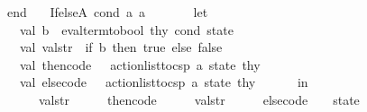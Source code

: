 \begin{isabellebody}
\ \ \ \ \ \ end\isanewline
\ \ {\isacharbar}{\kern0pt}\ IfelseA\ {\isacharparenleft}{\kern0pt}{\isacharparenleft}{\kern0pt}cond{\isacharcomma}{\kern0pt}\ a{}{\isacharparenright}{\kern0pt}{\isacharcomma}{\kern0pt}\ a{}{\isacharparenright}{\kern0pt}\ {\isacharequal}{\kern0pt}{\isachargreater}{\kern0pt}\isanewline
\ \ \ \ \ \ let\isanewline
\ \ \ \ \ \ \ \ val\ b\ {\isacharequal}{\kern0pt}\ eval{\isacharunderscore}{\kern0pt}term{\isacharunderscore}{\kern0pt}to{\isacharunderscore}{\kern0pt}bool\ thy\ cond\ state\isanewline
\ \ \ \ \ \ \ \ val\ val{\isacharunderscore}{\kern0pt}str\ {\isacharequal}{\kern0pt}\ if\ b\ then\ {\isachardoublequote}{\kern0pt}true{\isachardoublequote}{\kern0pt}\ else\ {\isachardoublequote}{\kern0pt}false{\isachardoublequote}{\kern0pt}\isanewline
\ \ \ \ \ \ \ \ val\ {\isacharparenleft}{\kern0pt}then{\isacharunderscore}{\kern0pt}code{\isacharcomma}{\kern0pt}\ {\isacharunderscore}{\kern0pt}{\isacharparenright}{\kern0pt}\ {\isacharequal}{\kern0pt}\ action{\isacharunderscore}{\kern0pt}list{\isacharunderscore}{\kern0pt}to{\isacharunderscore}{\kern0pt}csp\ a{}\ state\ thy\isanewline
\ \ \ \ \ \ \ \ val\ {\isacharparenleft}{\kern0pt}else{\isacharunderscore}{\kern0pt}code{\isacharcomma}{\kern0pt}\ {\isacharunderscore}{\kern0pt}{\isacharparenright}{\kern0pt}\ {\isacharequal}{\kern0pt}\ action{\isacharunderscore}{\kern0pt}list{\isacharunderscore}{\kern0pt}to{\isacharunderscore}{\kern0pt}csp\ a{}\ state\ thy\isanewline
\ \ \ \ \ \ in\isanewline
\ \ \ \ \ \ \ \ {\isacharparenleft}{\kern0pt}{\isachardoublequote}{\kern0pt}{\isacharbraceleft}{\kern0pt}\ {\isacharparenleft}{\kern0pt}{\isachardoublequote}{\kern0pt}\ {\isacharcircum}{\kern0pt}\ val{\isacharunderscore}{\kern0pt}str\ {\isacharcircum}{\kern0pt}\ {\isachardoublequote}{\kern0pt}\ {\isacharampersand}{\kern0pt}\ {\isachardoublequote}{\kern0pt}\ {\isacharcircum}{\kern0pt}\ then{\isacharunderscore}{\kern0pt}code\ {\isacharcircum}{\kern0pt}\ {\isachardoublequote}{\kern0pt}{\isacharparenright}{\kern0pt}\ {\isacharbrackleft}{\kern0pt}{\isacharbrackright}{\kern0pt}\ {\isacharparenleft}{\kern0pt}{\isasymnot}{\isachardoublequote}{\kern0pt}\ {\isacharcircum}{\kern0pt}\ val{\isacharunderscore}{\kern0pt}str\ {\isacharcircum}{\kern0pt}\ {\isachardoublequote}{\kern0pt}\ {\isacharampersand}{\kern0pt}\ {\isachardoublequote}{\kern0pt}\ {\isacharcircum}{\kern0pt}\ else{\isacharunderscore}{\kern0pt}code\ {\isacharcircum}{\kern0pt}\ {\isachardoublequote}{\kern0pt}{\isacharparenright}{\kern0pt}\ {\isacharbraceright}{\kern0pt}{\isachardoublequote}{\kern0pt}{\isacharcomma}{\kern0pt}\ state{\isacharparenright}{\kern0pt}\isanewline

\end{isabellebody}
